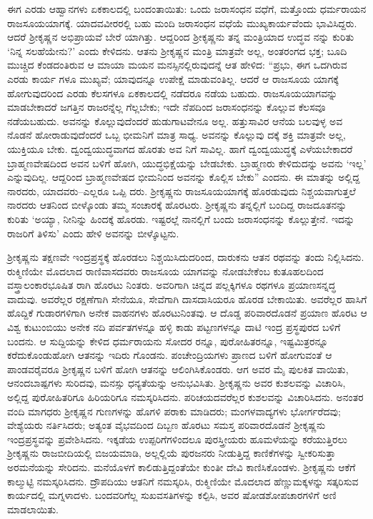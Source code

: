 ಈಗ ಎರಡು ಆಹ್ವಾನಗಳು ಏಕಕಾಲದಲ್ಲಿ ಬಂದಂತಾಯಿತು: ಒಂದು ಜರಾಸಂಧನ ವಧೆಗೆ, ಮತ್ತೊಂದು ಧರ್ಮರಾಯನ ರಾಜಸೂಯಯಾಗಕ್ಕೆ. ಯಾದವವೀರರಲ್ಲಿ ಬಹು ಮಂದಿ ಜರಾಸಂಧನ ವಧೆಯೆ ಮುಖ್ಯಕಾರ್ಯವೆಂದು ಭಾವಿಸಿದ್ದರು. ಆದರೆ ಶ್ರೀಕೃಷ್ಣನ ಅಭಿಪ್ರಾಯವೆ ಬೇರೆ ಯಾಗಿತ್ತು. ಆದ್ದರಿಂದ ಶ್ರೀಕೃಷ್ಣನು ತನ್ನ ಮಂತ್ರಿಯಾದ ಉದ್ಧವ ನನ್ನು ಕುರಿತು ‘ನಿನ್ನ ಸಲಹೆಯೇನು?’ ಎಂದು ಕೇಳಿದನು. ಆತನು ಶ್ರೀಕೃಷ್ಣನ ಮಂತ್ರಿ ಮಾತ್ರವೇ ಅಲ್ಲ, ಅಂತರಂಗದ ಭಕ್ತ; ಬೂದಿ ಮುಚ್ಚಿದ ಕೆಂಡದಂತಿರುವ ಆ ಮಾಯಾ ಮಯನ ಮನಸ್ಸಿನಲ್ಲಿರುವುದನ್ನೆ ಆತ ಹೇಳಿದ: “ಪ್ರಭು, ಈಗ ಒದಗಿರುವ ಎರಡು ಕಾರ್ಯ ಗಳೂ ಮುಖ್ಯವೆ; ಯಾವುದನ್ನೂ ಉಪೇಕ್ಷೆ ಮಾಡುವಂತಿಲ್ಲ. ಆದರೆ ಆ ರಾಜಸೂಯ ಯಾಗಕ್ಕೆ ಹೋಗುವುದರಿಂದ ಎರಡು ಕೆಲಸಗಳೂ ಏಕಕಾಲದಲ್ಲಿ ನಡೆದರೂ ನಡೆಯ ಬಹುದು. ರಾಜಸೂಯಯಾಗವನ್ನು ಮಾಡಬೇಕಾದರೆ ಜಗತ್ತಿನ ರಾಜರನ್ನೆಲ್ಲ ಗೆಲ್ಲಬೇಕು; ಇದೇ ನೆಪದಿಂದ ಜರಾಸಂಧನನ್ನು ಕೊಲ್ಲುವ ಕೆಲಸವೂ ನಡೆಯಬಹುದು. ಅವನನ್ನು ಕೊಲ್ಲುವುದೆಂದರೆ ಹುಡುಗಾಟವೇನೂ ಅಲ್ಲ. ಹತ್ತುಸಾವಿರ ಆನೆಯ ಬಲವುಳ್ಳ ಅವ ನೊಡನೆ ಹೋರಾಡುವುದೆಂದರೆ ಒಬ್ಬ ಭೀಮನಿಗೆ ಮಾತ್ರ ಸಾಧ್ಯ. ಅವನನ್ನು ಕೊಲ್ಲುವು ದಕ್ಕೆ ಶಕ್ತಿ ಮಾತ್ರವೇ ಅಲ್ಲ, ಯುಕ್ತಿಯೂ ಬೇಕು. ದ್ವಂದ್ವಯುದ್ಧವಾಗದ ಹೊರತು ಅವ ನಿಗೆ ಸಾವಿಲ್ಲ. ಹಾಗೆ ದ್ವಂದ್ವಯುದ್ಧಕ್ಕೆ ಎಳೆಯಬೇಕಾದರೆ ಬ್ರಾಹ್ಮಣವೇಷದಿಂದ ಅವನ ಬಳಿಗೆ ಹೋಗಿ, ಯುದ್ಧಭಿಕ್ಷೆಯನ್ನು ಬೇಡಬೇಕು. ಬ್ರಾಹ್ಮಣರು ಕೇಳಿದುದನ್ನು ಅವನು ‘ಇಲ್ಲ’ ಎನ್ನುವುದಿಲ್ಲ. ಆದ್ದರಿಂದ ಬ್ರಾಹ್ಮಣವೇಷದ ಭೀಮನಿಂದ ಅವನನ್ನು ಕೊಲ್ಲಿಸ ಬೇಕು” ಎಂದನು. ಈ ಮಾತನ್ನು ಅಲ್ಲಿದ್ದ ನಾರದರು, ಯಾದವರು–ಎಲ್ಲರೂ ಒಪ್ಪಿ ದರು. ಶ್ರೀಕೃಷ್ಣನು ರಾಜಸೂಯಯಾಗಕ್ಕೆ ಹೊರಡುವುದು ನಿಶ್ಚಯವಾಗುತ್ತಲೆ ನಾರದರು ಆತನಿಂದ ಬೀಳ್ಕೊಂಡು ತಮ್ಮ ಸಂಚಾರಕ್ಕೆ ಹೊರಟರು. ಶ್ರೀಕೃಷ್ಣನು ತನ್ನಲ್ಲಿಗೆ ಬಂದಿದ್ದ ರಾಜದೂತನನ್ನು ಕುರಿತು ‘ಅಯ್ಯಾ, ನೀನಿನ್ನು ಹಿಂದಕ್ಕೆ ಹೊರಡು. ಇಷ್ಟರಲ್ಲೆ ನಾನಲ್ಲಿಗೆ ಬಂದು ಜರಾಸಂಧನನ್ನು ಕೊಲ್ಲುತ್ತೇನೆ. ಇದನ್ನು ರಾಜರಿಗೆ ತಿಳಿಸು’ ಎಂದು ಹೇಳಿ ಅವನನ್ನು ಬೀಳ್ಕೊಟ್ಟನು.

ಶ್ರೀಕೃಷ್ಣನು ತಕ್ಷಣವೇ ಇಂದ್ರಪ್ರಸ್ಥಕ್ಕೆ ಹೊರಡಲು ನಿಶ್ಚಯಿಸಿದುದರಿಂದ, ದಾರುಕನು ಆತನ ರಥವನ್ನು ತಂದು ನಿಲ್ಲಿಸಿದನು. ರುಕ್ಮಿಣಿಯೇ ಮೊದಲಾದ ರಾಣಿವಾಸದವರು ರಾಜಸೂಯ ಯಾಗವನ್ನು ನೋಡಬೇಕೆಂಬ ಕುತೂಹಲದಿಂದ ವಸ್ತ್ರಾಲಂಕಾರಭೂಷಿತ ರಾಗಿ ಹೊರಟು ನಿಂತರು. ಅವರಿಗಾಗಿ ಚಿನ್ನದ ಪಲ್ಲಕ್ಕಿಗಳೂ ರಥಗಳೂ ಪ್ರಯಾಣಸನ್ನದ್ಧ ವಾದುವು. ಅವರೆಲ್ಲರ ರಕ್ಷಣೆಗಾಗಿ ಸೇನೆಯೂ, ಸೇವೆಗಾಗಿ ದಾಸದಾಸಿಯರೂ ಹೊರಡ ಬೇಕಾಯಿತು. ಅವರೆಲ್ಲರ ಹಾಸಿಗೆ ಹೊದ್ದಿಕೆ ಗುಡಾರಗಳಿಗಾಗಿ ಅನೇಕ ವಾಹನಗಳು ಹೊರಟುನಿಂತವು. ಆ ದೊಡ್ಡ ಪರಿವಾರದೊಡನೆ ಪ್ರಯಾಣ ಹೊರಟ ಆ ವಿಶ್ವ ಕುಟುಂಬಿಯು ಅನೇಕ ನದಿ ಪರ್ವತಗಳನ್ನೂ ಹಳ್ಳಿ ಕಾಡು ಪಟ್ಟಣಗಳನ್ನೂ ದಾಟಿ ಇಂದ್ರ ಪ್ರಸ್ಥಪುರದ ಬಳಿಗೆ ಬಂದನು. ಆ ಸುದ್ದಿಯನ್ನು ಕೇಳಿದ ಧರ್ಮರಾಯನು ಸೋದರ ರನ್ನೂ, ಪುರೋಹಿತರನ್ನೂ, ಇಷ್ಟಮಿತ್ರರನ್ನೂ ಕರೆದುಕೊಂಡುಹೋಗಿ ಆತನನ್ನು ಇದಿರು ಗೊಂಡನು. ಪಂಚೇಂದ್ರಿಯಗಳು ಪ್ರಾಣದ ಬಳಿಗೆ ಹೋಗುವಂತೆ ಆ ಪಾಂಡವರೈವರೂ ಶ್ರೀಕೃಷ್ಣನ ಬಳಿಗೆ ಹೋಗಿ ಆತನನ್ನು ಆಲಿಂಗಿಸಿಕೊಂಡರು. ಆಗ ಅವರ ಮೈ ಪುಲಕಿತ ವಾಯಿತು, ಆನಂದಬಾಷ್ಪಗಳು ಸುರಿದವು, ಮನಸ್ಸು ಧನ್ಯತೆಯನ್ನು ಅನುಭವಿಸಿತು. ಶ್ರೀಕೃಷ್ಣನು ಅವರ ಕುಶಲವನ್ನು ವಿಚಾರಿಸಿ, ಅಲ್ಲಿದ್ದ ಪುರೋಹಿತರಿಗೂ ಹಿರಿಯರಿಗೂ ನಮಸ್ಕರಿಸಿದನು. ಪರಿಚಯದವರೆಲ್ಲರ ಕುಶಲವನ್ನು ವಿಚಾರಿಸಿದನು. ಅನಂತರ ವಂದಿ ಮಾಗಧರು ಶ್ರೀಕೃಷ್ಣನ ಗುಣಗಳನ್ನು ಹೊಗಳಿ ಪರಾಕು ಮಾಡಿದರು; ಮಂಗಳವಾದ್ಯಗಳು ಭೋರ್ಗರೆದವು; ವೇಶ್ಯೆಯರು ನರ್ತಿಸಿದರು; ಅತ್ಯಂತ ವೈಭವದಿಂದ ದಿಬ್ಬಣ ಹೊರಟು ಸಮಸ್ತ ಪರಿವಾರದೊಡನೆ ಶ್ರೀಕೃಷ್ಣನು ಇಂದ್ರಪ್ರಸ್ಥವನ್ನು ಪ್ರವೇಶಿಸಿದನು. ಇಕ್ಕಡೆಯ ಉಪ್ಪರಿಗೆಗಳಿಂದಲೂ ಪುರಸ್ತ್ರೀಯರು ಹೂಮಳೆಯನ್ನು ಕರೆಯುತ್ತಿರಲು ಶ್ರೀಕೃಷ್ಣನು ರಾಜಬೀದಿಯಲ್ಲಿ ಬಿಜಯಮಾಡಿ, ಅಲ್ಲಲ್ಲಿಯೆ ಪುರಜನರು ನೀಡುತ್ತಿದ್ದ ಕಾಣಿಕೆಗಳನ್ನು ಸ್ವೀಕರಿಸುತ್ತಾ ಅರಮನೆಯನ್ನು ಸೇರಿದನು. ಮನೆಯೊಳಗೆ ಕಾಲಿಡುತ್ತಿದ್ದಂತೆಯೇ ಕುಂತೀ ದೇವಿ ಕಾಣಿಸಿಕೊಂಡಳು. ಶ್ರೀಕೃಷ್ಣನು ಆಕೆಗೆ ಕಾಲ್ಮುಟ್ಟಿ ನಮಸ್ಕರಿಸಿದನು. ದ್ರೌಪದಿಯು ಆತನಿಗೆ ನಮಸ್ಕರಿಸಿ, ರುಕ್ಮಿಣಿಯೇ ಮೊದಲಾದ ಹೆಣ್ಣುಮಕ್ಕಳನ್ನು ಸತ್ಕರಿಸುವ ಕಾರ್ಯದಲ್ಲಿ ಮಗ್ನಳಾದಳು. ಬಂದವರಿಗೆಲ್ಲ ಸುಖವಸತಿಗಳನ್ನು ಕಲ್ಪಿಸಿ, ಅವರ ಷೋಡಶೋಪಚಾರಗಳಿಗೆ ಅಣಿ ಮಾಡಲಾಯಿತು.

